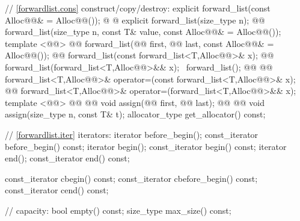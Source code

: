 \documentclass[american,twoside]{book}
\begin{document}
\begin{codeblock}
{{    // \ref{forwardlist.cons} construct/copy/destroy: 
    explicit forward_list(const Alloc@@& = Alloc@@()); 
    @ @ 
      explicit forward_list(size_type n);
    @@ 
      forward_list(size_type n, const T& value, 
                   const Alloc@@& = Alloc@@()); 
    template <@@>
      @@
      forward_list(@@ first, @@ last, 
                   const Alloc@@& = Alloc@@()); 
    @@ 
      forward_list(const forward_list<T,Alloc@@>& x);
    @@ forward_list(forward_list<T,Alloc@@>&& x);
    ~forward_list(); 
    @@ @@
      forward_list<T,Alloc@@>& operator=(const forward_list<T,Alloc@@>& x);
    @@
      forward_list<T,Alloc@@>& operator=(forward_list<T,Alloc@@>&& x); 
    template <@@> 
      @@
            @@
      void assign(@@ first, @@ last); 
    @@ @@
      void assign(size_type n, const T& t); 
    allocator_type get_allocator() const; 

    // \ref{forwardlist.iter} iterators:
    iterator before_begin();
    const_iterator before_begin() const;
    iterator begin(); 
    const_iterator begin() const; 
    iterator end(); 
    const_iterator end() const;

    const_iterator cbegin() const;
    const_iterator cbefore_begin() const;
    const_iterator cend() const;

    // capacity: 
    bool empty() const; 
    size_type max_size() const;

}}
\end{codeblock}
\end{document}
